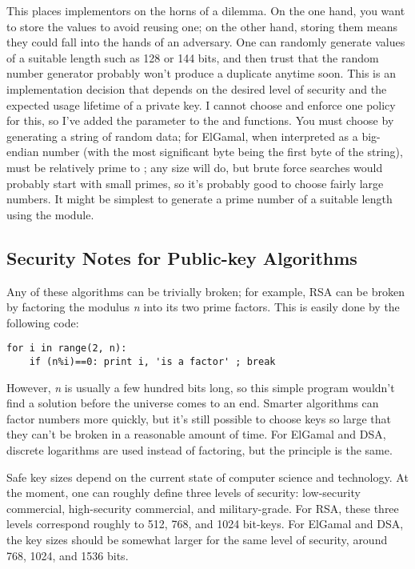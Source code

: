 \documentclass{howto}
\begin{document}
This places implementors on the horns of a dilemma.  On the one hand,
you want to store the  values to avoid reusing one; on the other
hand, storing them means they could fall into the hands of an adversary.
One can randomly generate  values of a suitable length such as
128 or 144 bits, and then trust that the random number generator
probably won't produce a duplicate anytime soon.  This is an
implementation decision that depends on the desired level of security
and the expected usage lifetime of a private key.  I cannot choose and
enforce one policy for this, so I've added the  parameter to the
 and  functions.  You must choose  by
generating a string of random data; for ElGamal, when interpreted as a
big-endian number (with the most significant byte being the first byte
of the string),  must be relatively prime to ; any
size will do, but brute force searches would probably start with small
primes, so it's probably good to choose fairly large numbers.  It might be
simplest to generate a prime number of a suitable length using the
 module.

\subsection{Security Notes for Public-key Algorithms}
Any of these algorithms can be trivially broken; for example, RSA can be
broken by factoring the modulus \emph{n} into its two prime factors.
This is easily done by the following code:

\begin{verbatim}
for i in range(2, n): 
    if (n%i)==0: print i, 'is a factor' ; break
\end{verbatim}


However, \emph{n} is usually a few hundred bits long, so this simple
program wouldn't find a solution before the universe comes to an end.
Smarter algorithms can factor numbers more quickly, but it's still
possible to choose keys so large that they can't be broken in a
reasonable amount of time.  For ElGamal and DSA, discrete logarithms are
used instead of factoring, but the principle is the same.

Safe key sizes depend on the current state of computer science and
technology.  At the moment, one can roughly define three levels of
security: low-security commercial, high-security commercial, and
military-grade.  For RSA, these three levels correspond roughly to 512,
768, and 1024 bit-keys.  For ElGamal and DSA, the key sizes should be
somewhat larger for the same level of security, around 768, 1024, and
1536 bits.
\end{document}
